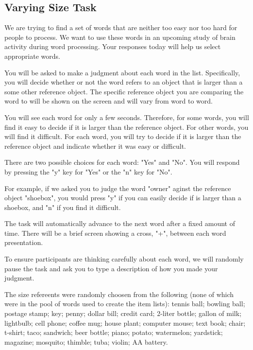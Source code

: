 \documentclass[man,natbib,floatsintext]{apa6} %
\begin{document}
\subsection{Varying Size Task}
\begin{displayquote}
We are trying to find a set of words that are neither too easy nor too hard for people to process. We want to use these words in an upcoming study of brain activity during word processing. Your responses today will help us select appropriate words.

       You will be asked to make a judgment about each word in the list.
       Specifically, you will decide whether or not the word refers to an object that is larger than a some other reference object.
           The specific reference object you are comparing the word to will be shown on the screen and will vary from word to word.

       You will see each word for only a few seconds. Therefore, for some words, you will find it easy to
           decide if it is larger than the reference object. For other words, you will find it difficult.
           For each word, you will try to decide if it is larger than the reference object and indicate whether it was easy or difficult.

      There are two possible choices for each word: "Yes" and "No". You will respond by pressing
      the "y" key for "Yes" or the "n" key for "No".

      For example, if we asked you to judge the word "owner" aginst the reference object "shoebox", you would press "y" if you can easily decide
          if is larger than a shoebox, and "n" if you find it difficult.

      The task will automatically advance to the next word after a fixed amount of time.
      There will be a brief screen showing a cross, "+", between each word presentation.

      To ensure participants are thinking carefully about each word, we will
          randomly pause the task and ask you to type a description of how you made your judgment.
\end{displayquote}
The size refereents were randomly choosen from the following (none of which were in the pool of words used to create the item lists):
tennis ball; bowling ball; postage stamp; key; penny; dollar bill; credit card; 2-liter bottle; gallon of milk; lightbulb; cell phone; coffee mug; house plant; computer mouse; text book; chair; t-shirt; taco; sandwich; beer bottle; piano; potato; watermelon; yardstick; magazine; mosquito; thimble; tuba; violin; AA battery.
\end{document}
